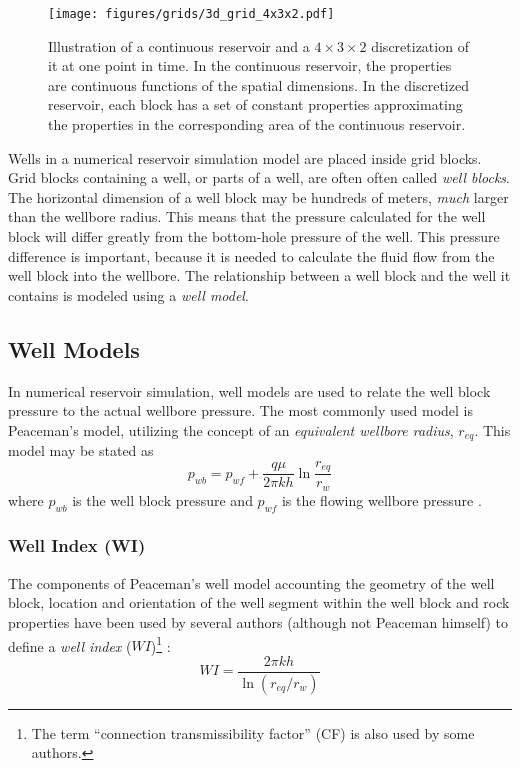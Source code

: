 \begin{figure}[htbp]
    \centering
    \texttt{[image: figures/grids/3d\_grid\_4x3x2.pdf]}
    \caption{Illustration of a continuous reservoir and a $4\times 3\times 2$ discretization of it at one point in time. In the continuous reservoir, the properties are continuous functions of the spatial dimensions. In the discretized reservoir, each block has a set of constant properties approximating the properties in the corresponding area of the continuous reservoir.}
    \label{fig:grid-discretization}
\end{figure}


Wells in a numerical reservoir simulation model are placed inside grid blocks. Grid blocks containing a well, or parts of a well, are often often called \emph{well blocks}. The horizontal dimension of a well block may be hundreds of meters, \emph{much} larger than the wellbore radius. This means that the pressure calculated for the well block will differ greatly from the bottom-hole pressure of the well. This pressure difference is important, because it is needed to calculate the fluid flow  from the well block into the wellbore. The relationship between a well block and the well it contains is modeled using a \emph{well model}.

\subsection{Well Models} %
\label{sub:well_models}
In numerical reservoir simulation, well models are used to relate the well block pressure to the actual wellbore pressure. The most commonly used model is Peaceman's model, utilizing the concept of an \emph{equivalent wellbore radius}, $r_{eq}$. This model may be stated as
\begin{equation}
    \label{eq:intro-well-model}
    p_{wb} = p_{wf} + \frac{q\mu}{2\pi k h} \ln \frac{r_{eq}}{r_{w}}
\end{equation}
where $p_{wb}$ is the well block pressure and $p_{wf}$ is the flowing wellbore pressure \cite{Peaceman1990Interpretation}.

\subsubsection{Well Index (WI)} %
\label{ssub:well_index_}
The components of Peaceman's well model accounting the geometry of the well block, location and orientation of the well segment within the well block and rock properties have been used by several authors (although not Peaceman himself) to define a \emph{well index} ($WI$)\footnote{The term ``connection transmissibility factor'' (CF) is also used by some authors\cite{Peaceman2003New,Schlumberger2013Eclipse}.} \cite{Wolfsteiner2003Calculation}:
\begin{equation}
    \label{eq:well-index-intro}
    WI = \frac{2\pi kh}{\ln \left(r_{eq}/r_{w}\right)}
\end{equation}

